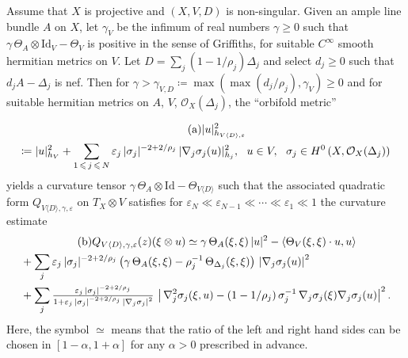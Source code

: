 \documentclass[AHL,Unicode,longabstracts,published]{cedram}
\DeclarePairedDelimiter{\abs}{\lvert}{\rvert}
\newcommand*\Id{\mathrm{Id}}
\newcommand*\cO{\mathcal{O}}
\let\leq\leqslant
\let\geq\geqslant
\newcommand*\bydef{\coloneqq}
\begin{document}
\begin{theo}\label{theo:orbi_curv_estimate}
Assume that $X$ is projective and $(X,V,D)$ is non-singular. Given an ample line bundle $A$ on $X$, let $\gamma_V$ be the infimum of real numbers $\gamma\geq 0$ such that $\gamma\,\Theta_A\otimes\Id_V -\Theta_V$ is positive in the sense of Griffiths, for suitable $C^\infty$ smooth hermitian metrics on $V$. Let $D=\sum_j(1-1/\rho_j)\Delta_j$ and select $d_j\geq 0$ such that $d_jA-\Delta_j$ is nef. Then for $\gamma>\gamma_{V,D}\bydef\max(\max(d_j/\rho_j),\gamma_V)\geq 0$ and for suitable hermitian metrics on $A$, $V$, $\cO_X(\Delta_j)$, the ``orbifold metric''

\begin{multline}\label{theo1.10.a}
\tag{a}
\abs{u}_{h_{V\langle D\rangle,\varepsilon}}^2\\
\bydef
\abs{u}^2_{h_V}+\sum_{1\,\leq\,j\,\leq\,N}\varepsilon_j\,\abs{\sigma_j}^{-2+2/\rho_j}\,
\abs{\nabla_j\sigma_j(u)}^2_{h_j},~~u\in V,~~\sigma_j\in H^0\left(X,\cO_X(\Delta_j)\right)
\end{multline}
yields a curvature tensor $\gamma\,\Theta_A\otimes\Id-\Theta_{V\langle D\rangle}$ such that the associated quadratic form $Q_{V\langle D\rangle,\gamma,\varepsilon}$ on
$T_X\otimes V$ satisfies for
$\varepsilon_N\ll\varepsilon_{N-1}\ll\cdots\ll\varepsilon_1\ll 1$ the curvature estimate
\begin{multline}\label{theo1.10.b}
\tag{b} Q_{V\langle D\rangle,\gamma,\varepsilon} (z)(\xi\otimes u)\simeq\gamma\,\Theta_A(\xi,\xi)\,\abs{u}^2 -\langle\Theta_V(\xi,\xi)\cdot u,u\rangle
\\
\begin{aligned}
&+\sum_j\varepsilon_j\,\abs{\sigma_j}^{-2+2/\rho_j}\,
\big(\gamma\,\Theta_A(\xi,\xi)-\rho_j^{-1}\,\Theta_{\Delta_j}(\xi,\xi)\big)
\,\left|\nabla_j\sigma_j(u)\right|^2
\\
&+\sum_j\tfrac{\varepsilon_j\,\abs{\sigma_j}^{-2+2/\rho_j}}{ 1+\varepsilon_j\,\abs{\sigma_j}^{-2+2/\rho_j}\,
\left|\nabla_j\sigma_j\right|^2}\,\left|\,\nabla_j^2\sigma_j(\xi,u)-(1-1/\rho_j)\,
\sigma_j^{-1}\,\nabla_j\sigma_j(\xi)\nabla_j\sigma_j(u)\right|^2.
\end{aligned}
\end{multline}
Here, the symbol $\simeq$ means that the ratio of the left and right hand sides can be chosen in $[1-\alpha,1+\alpha]$ for any
$\alpha>0$ prescribed in advance.
\end{theo}
\end{document}
